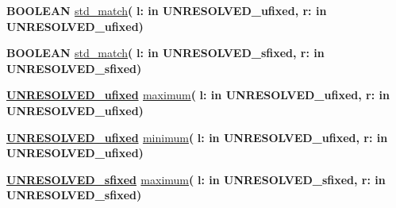 \begin{DoxyCompactItemize}
\item 
{\bfseries {\bfseries \textcolor{comment}{B\+O\+O\+L\+E\+A\+N}\textcolor{vhdlchar}{ }}} \hyperlink{classfixed__pkg_a44234a02f5050616aa4f4ab83a217d8e}{std\+\_\+match}{\bfseries  ( }{\bfseries \textcolor{vhdlchar}{l\+: }\textcolor{stringliteral}{in }\textcolor{vhdlchar}{U\+N\+R\+E\+S\+O\+L\+V\+E\+D\+\_\+ufixed}}{\bfseries  , \textcolor{vhdlchar}{r\+: }\textcolor{stringliteral}{in }\textcolor{vhdlchar}{U\+N\+R\+E\+S\+O\+L\+V\+E\+D\+\_\+ufixed}}{\bfseries  )} 
\item 
{\bfseries {\bfseries \textcolor{comment}{B\+O\+O\+L\+E\+A\+N}\textcolor{vhdlchar}{ }}} \hyperlink{classfixed__pkg_a44234a02f5050616aa4f4ab83a217d8e}{std\+\_\+match}{\bfseries  ( }{\bfseries \textcolor{vhdlchar}{l\+: }\textcolor{stringliteral}{in }\textcolor{vhdlchar}{U\+N\+R\+E\+S\+O\+L\+V\+E\+D\+\_\+sfixed}}{\bfseries  , \textcolor{vhdlchar}{r\+: }\textcolor{stringliteral}{in }\textcolor{vhdlchar}{U\+N\+R\+E\+S\+O\+L\+V\+E\+D\+\_\+sfixed}}{\bfseries  )} 
\item 
{\bfseries {\bfseries {\bfseries \hyperlink{classfixed__pkg_ae78bc2b36d22f6abeac163955e8a587d}{U\+N\+R\+E\+S\+O\+L\+V\+E\+D\+\_\+ufixed}} \textcolor{vhdlchar}{ }}} \hyperlink{classfixed__pkg_aaa583443bea04e0ef9aec0f01379504e}{maximum}{\bfseries  ( }{\bfseries \textcolor{vhdlchar}{l\+: }\textcolor{stringliteral}{in }\textcolor{vhdlchar}{U\+N\+R\+E\+S\+O\+L\+V\+E\+D\+\_\+ufixed}}{\bfseries  , \textcolor{vhdlchar}{r\+: }\textcolor{stringliteral}{in }\textcolor{vhdlchar}{U\+N\+R\+E\+S\+O\+L\+V\+E\+D\+\_\+ufixed}}{\bfseries  )} 
\item 
{\bfseries {\bfseries {\bfseries \hyperlink{classfixed__pkg_ae78bc2b36d22f6abeac163955e8a587d}{U\+N\+R\+E\+S\+O\+L\+V\+E\+D\+\_\+ufixed}} \textcolor{vhdlchar}{ }}} \hyperlink{classfixed__pkg_ad4adeedf9111551b8d7ff73c8ebc0c5a}{minimum}{\bfseries  ( }{\bfseries \textcolor{vhdlchar}{l\+: }\textcolor{stringliteral}{in }\textcolor{vhdlchar}{U\+N\+R\+E\+S\+O\+L\+V\+E\+D\+\_\+ufixed}}{\bfseries  , \textcolor{vhdlchar}{r\+: }\textcolor{stringliteral}{in }\textcolor{vhdlchar}{U\+N\+R\+E\+S\+O\+L\+V\+E\+D\+\_\+ufixed}}{\bfseries  )} 
\item 
{\bfseries {\bfseries {\bfseries \hyperlink{classfixed__pkg_aa723b28a027c3c0f9bca02d75e8df4d6}{U\+N\+R\+E\+S\+O\+L\+V\+E\+D\+\_\+sfixed}} \textcolor{vhdlchar}{ }}} \hyperlink{classfixed__pkg_ad28924ba158c1aecb85d28cf6a8f60e7}{maximum}{\bfseries  ( }{\bfseries \textcolor{vhdlchar}{l\+: }\textcolor{stringliteral}{in }\textcolor{vhdlchar}{U\+N\+R\+E\+S\+O\+L\+V\+E\+D\+\_\+sfixed}}{\bfseries  , \textcolor{vhdlchar}{r\+: }\textcolor{stringliteral}{in }\textcolor{vhdlchar}{U\+N\+R\+E\+S\+O\+L\+V\+E\+D\+\_\+sfixed}}{\bfseries  )} 

\end{DoxyCompactItemize}
